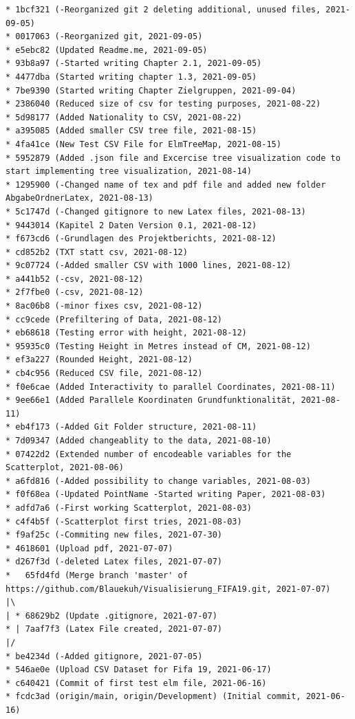 \documentclass[usegeometry=true]{scrartcl}
\begin{document}
\begin{verbatim}
* 1bcf321 (-Reorganized git 2 deleting additional, unused files, 2021-09-05)
* 0017063 (-Reorganized git, 2021-09-05)
* e5ebc82 (Updated Readme.me, 2021-09-05)
* 93b8a97 (-Started writing Chapter 2.1, 2021-09-05)
* 4477dba (Started writing chapter 1.3, 2021-09-05)
* 7be9390 (Started writing Chapter Zielgruppen, 2021-09-04)
* 2386040 (Reduced size of csv for testing purposes, 2021-08-22)
* 5d98177 (Added Nationality to CSV, 2021-08-22)
* a395085 (Added smaller CSV tree file, 2021-08-15)
* 4fa41ce (New Test CSV File for ElmTreeMap, 2021-08-15)
* 5952879 (Added .json file and Excercise tree visualization code to start implementing tree visualization, 2021-08-14)
* 1295900 (-Changed name of tex and pdf file and added new folder AbgabeOrdnerLatex, 2021-08-13)
* 5c1747d (-Changed gitignore to new Latex files, 2021-08-13)
* 9443014 (Kapitel 2 Daten Version 0.1, 2021-08-12)
* f673cd6 (-Grundlagen des Projektberichts, 2021-08-12)
* cd852b2 (TXT statt csv, 2021-08-12)
* 9c07724 (-Added smaller CSV with 1000 lines, 2021-08-12)
* a441b52 (-csv, 2021-08-12)
* 2f7fbe0 (-csv, 2021-08-12)
* 8ac06b8 (-minor fixes csv, 2021-08-12)
* cc9cede (Prefiltering of Data, 2021-08-12)
* eb68618 (Testing error with height, 2021-08-12)
* 95935c0 (Testing Height in Metres instead of CM, 2021-08-12)
* ef3a227 (Rounded Height, 2021-08-12)
* cb4c956 (Reduced CSV file, 2021-08-12)
* f0e6cae (Added Interactivity to parallel Coordinates, 2021-08-11)
* 9ee66e1 (Added Parallele Koordinaten Grundfunktionalität, 2021-08-11)
* eb4f173 (-Added Git Folder structure, 2021-08-11)
* 7d09347 (Added changeablity to the data, 2021-08-10)
* 07422d2 (Extended number of encodeable variables for the Scatterplot, 2021-08-06)
* a6fd816 (-Added possibility to change variables, 2021-08-03)
* f0f68ea (-Updated PointName -Started writing Paper, 2021-08-03)
* adfd7a6 (-First working Scatterplot, 2021-08-03)
* c4f4b5f (-Scatterplot first tries, 2021-08-03)
* f9af25c (-Commiting new files, 2021-07-30)
* 4618601 (Upload pdf, 2021-07-07)
* d267f3d (-deleted Latex files, 2021-07-07)
*   65fd4fd (Merge branch 'master' of https://github.com/Blauekuh/Visualisierung_FIFA19.git, 2021-07-07)
|\
| * 68629b2 (Update .gitignore, 2021-07-07)
* | 7aaf7f3 (Latex File created, 2021-07-07)
|/
* be4234d (-Added gitignore, 2021-07-05)
* 546ae0e (Upload CSV Dataset for Fifa 19, 2021-06-17)
* c640421 (Commit of first test elm file, 2021-06-16)
* fcdc3ad (origin/main, origin/Development) (Initial commit, 2021-06-16)
\end{verbatim}



\printbibliography
\end{document}
